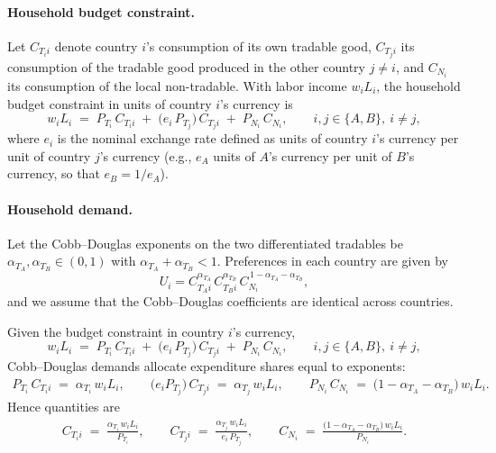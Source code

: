 \documentclass[11pt]{article}
\begin{document}
\paragraph{Household budget constraint.}
Let $C_{T_i i}$ denote country $i$'s consumption of its own tradable good, $C_{T_j i}$ its consumption of the tradable good produced in the other country $j \neq i$, and $C_{N_i}$ its consumption of the local non-tradable. With labor income $w_i L_i$, the household budget constraint in units of country $i$’s currency is
\begin{equation}
w_i L_i 
\;=\; P_{T_i}\, C_{T_i i} 
\;+\; \big(e_i\, P_{T_j}\big)\, C_{T_j i} 
\;+\; P_{N_i}\, C_{N_i},
\qquad i,j \in \{A,B\},\ i \neq j,
\label{eq:budget_i}
\end{equation}
where $e_i$ is the nominal exchange rate defined as units of country $i$’s currency per unit of country $j$’s currency (e.g., $e_A$ units of $A$’s currency per unit of $B$’s currency, so that $e_B = 1/e_A$).

\paragraph{Household demand.}
Let the Cobb--Douglas exponents on the two differentiated tradables be 
$\alpha_{T_A}, \alpha_{T_B} \in (0,1)$ with $\alpha_{T_A} + \alpha_{T_B} < 1$. 
Preferences in each country are given by
\[
U_i = C_{T_A i}^{\alpha_{T_A}}\, C_{T_B i}^{\alpha_{T_B}}\, C_{N_i}^{\,1-\alpha_{T_A}-\alpha_{T_B}},
\]
and we assume that the Cobb--Douglas coefficients are identical across countries.

Given the budget constraint in country $i$’s currency,
\[
w_i L_i \;=\; P_{T_i}\, C_{T_i i} \;+\; \big(e_i\,P_{T_j}\big)\, C_{T_j i} \;+\; P_{N_i}\, C_{N_i},
\qquad i,j\in\{A,B\},\ i\neq j,
\]
Cobb--Douglas demands allocate expenditure shares equal to exponents:
\begin{align}
P_{T_i}\, C_{T_i i} \;=\; \alpha_{T_i}\, w_i L_i, 
\qquad 
\big(e_i P_{T_j}\big)\, C_{T_j i} \;=\; \alpha_{T_j}\, w_i L_i,
\qquad
P_{N_i}\, C_{N_i} \;=\; \big(1-\alpha_{T_A}-\alpha_{T_B}\big)\, w_i L_i.
\end{align}
Hence quantities are
\begin{align}
C_{T_i i} \;=\; \frac{\alpha_{T_i}\, w_i L_i}{P_{T_i}}, 
\qquad
C_{T_j i} \;=\; \frac{\alpha_{T_j}\, w_i L_i}{e_i\, P_{T_j}},
\qquad
C_{N_i} \;=\; \frac{\big(1-\alpha_{T_A}-\alpha_{T_B}\big)\, w_i L_i}{P_{N_i}} .
\end{align}
\end{document}
